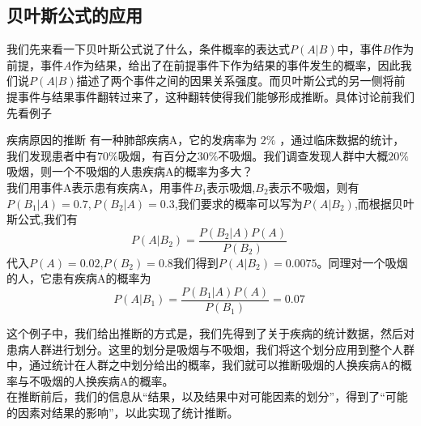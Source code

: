 \subsection{贝叶斯公式的应用}
我们先来看一下贝叶斯公式说了什么，条件概率的表达式$P(A|B)$中，事件$B$作为前提，事件$A$作为结果，给出了在前提事件下作为结果的事件发生的概率，因此我们说$P(A|B)$描述了两个事件之间的因果关系强度。而贝叶斯公式的另一侧将前提事件与结果事件翻转过来了，这种翻转使得我们能够形成推断。具体讨论前我们先看例子
\begin{example}{疾病原因的推断}
有一种肺部疾病A，它的发病率为 $2 \%$ ，通过临床数据的统计，我们发现患者中有$70\%$吸烟，有百分之$30\%$不吸烟。我们调查发现人群中大概$20\%$吸烟，则一个不吸烟的人患疾病A的概率为多大？\\
我们用事件A表示患有疾病A，用事件$B_1$表示吸烟,$B_2$表示不吸烟，则有$P(B_1|A) = 0.7,P(B_2|A)=0.3$,我们要求的概率可以写为$P(A|B_2)$,而根据贝叶斯公式,我们有
\begin{equation}
P(A|B_2) = \frac{P(B_2|A) P(A)}{P(B_2)}~
\end{equation}
代入$P(A)=0.02$,$P(B_2)=0.8$我们得到$P(A|B_2) = 0.0075$。同理对一个吸烟的人，它患有疾病A的概率为
\begin{equation}
P(A|B_1) = \frac{P(B_1|A) P(A)}{P(B_1)} = 0.07~
\end{equation}
\end{example}
这个例子中，我们给出推断的方式是，我们先得到了关于疾病的统计数据，然后对患病人群进行划分。这里的划分是吸烟与不吸烟，我们将这个划分应用到整个人群中，通过统计在人群之中划分给出的概率，我们就可以推断吸烟的人换疾病A的概率与不吸烟的人换疾病A的概率。\\
在推断前后，我们的信息从“结果，以及结果中对可能因素的划分”，得到了“可能的因素对结果的影响”，以此实现了统计推断。
